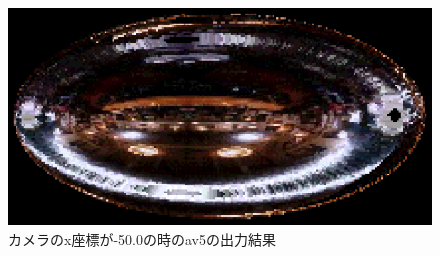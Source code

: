 \documentclass[a4j,dvipdfmx]{jsarticle}
\begin{document}
\begin{figure}[hp]
  \begin{center}
    \includegraphics[clip,scale=0.5]{images/Kadai05ForAv5-2.eps}
    \caption{カメラのx座標が-50.0の時のav5の出力結果}
    \label{fig:k5-2}
  \end{center}
\end{figure}
\end{document}
